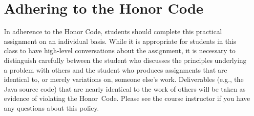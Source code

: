\documentclass[11pt]{article}
\begin{document}
\section*{Adhering to the Honor Code}

In adherence to the Honor Code, students should complete this practical assignment on an individual basis. While it is
appropriate for students in this class to have high-level conversations about the assignment, it is necessary to
distinguish carefully between the student who discusses the principles underlying a problem with others and the student
who produces assignments that are identical to, or merely variations on, someone else's work. Deliverables (e.g., the
Java source code) that are nearly identical to the work of others will be taken as evidence of violating the \mbox{Honor
Code}. Please see the course instructor if you have any questions about this policy.
\end{document}
